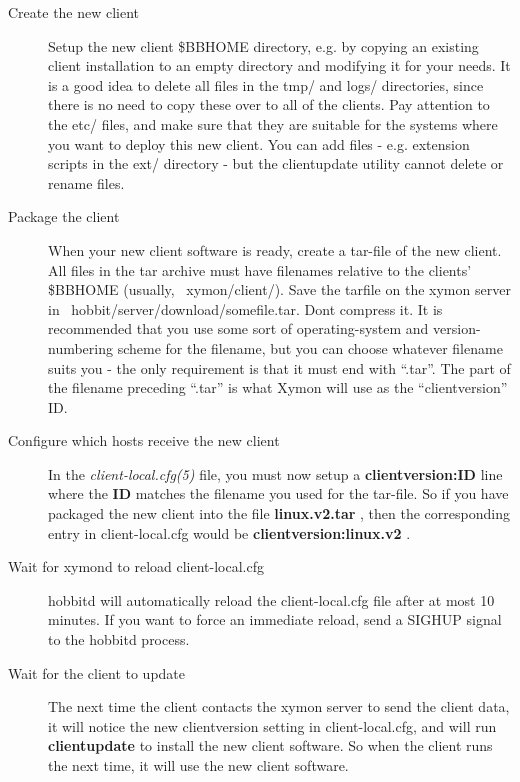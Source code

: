  \begin{description}
\item[Create the new client] Setup the new client \$BBHOME directory, e.g. by copying an existing client installation to an empty directory and modifying it for your needs. It is a good idea to delete all files in the tmp/ and logs/ directories, since there is no need to copy these over to all of the clients. Pay attention to the etc/ files, and make sure that they are suitable for the systems where you want to deploy this new client. You can add files - e.g. extension scripts in the ext/ directory - but the clientupdate utility cannot delete or rename files. 

 

\item[Package the client] When your new client software is ready, create a tar-file of the new client. All files in the tar archive must have filenames relative to the clients' \$BBHOME (usually, ~xymon/client/). Save the tarfile on the xymon server in ~hobbit/server/download/somefile.tar. Dont compress it. It is recommended that you use some sort of operating-system and version-numbering scheme for the filename, but you can choose whatever filename suits you - the only requirement is that it must end with ``.tar''. The part of the filename preceding ``.tar'' is what Xymon will use as the ``clientversion'' ID. 

 

\item[Configure which hosts receive the new client] In the \emph{client-local.cfg(5)}
 file, you must now setup a \textbf{clientversion:ID}
 line where the \textbf{ID}
 matches the filename you used for the tar-file. So if you have packaged the new client into the file \textbf{linux.v2.tar}
, then the corresponding entry in client-local.cfg would be \textbf{clientversion:linux.v2}
. 

 

\item[Wait for xymond to reload client-local.cfg] hobbitd will automatically reload the client-local.cfg file after at most 10 minutes. If you want to force an immediate reload, send a SIGHUP signal to the hobbitd process. 

 

\item[Wait for the client to update] The next time the client contacts the xymon server to send the client data, it will notice the new clientversion setting in client-local.cfg, and will run \textbf{clientupdate}
 to install the new client software. So when the client runs the next time, it will use the new client software. 

 


\end{description}

